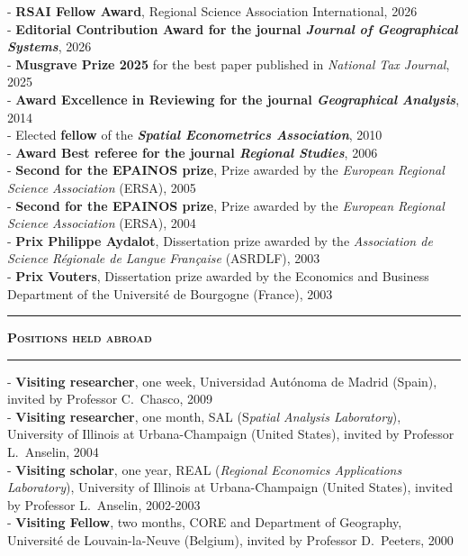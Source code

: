 \documentclass[a4paper,12pt]{article}
\newcommand{\titre}[1]{%
	\bigskip
	\noindent \rule[2mm]{\textwidth}{0.5pt}
	\textbf{\textsc{\large #1}} \\
	\noindent \rule[1mm]{\textwidth}{0.5pt}
	}
\begin{document}
\noindent \noindent - \textbf{RSAI Fellow Award}, Regional Science Association International,  2026 \\
- \textbf{\og{}Editorial Contribution Award\fg{} for the journal \textit{Journal of Geographical Systems}}, 2026 \\
- \textbf{Musgrave Prize 2025} for the best paper published in \textit{National Tax Journal},  2025 \\
- \textbf{Award \og{}Excellence in Reviewing\fg{} for the journal \textit{Geographical Analysis}}, 2014 \\
- Elected \textbf{fellow} of the \textit{\textbf{Spatial Econometrics Association}}, 2010 \\
- \textbf{Award \og{}Best referee\fg{} for the journal \textit{Regional Studies}}, 2006 \\
- \textbf{Second for the EPAINOS prize}, Prize awarded by the \textit{European Regional Science Association} (ERSA), 2005  \\ %
- \textbf{Second for the EPAINOS prize}, Prize awarded by the \textit{European Regional Science Association} (ERSA), 2004 \\ %
- \textbf{Prix Philippe Aydalot}, Dissertation prize awarded by the \textit{Association de Science Régionale de Langue Française} (ASRDLF), 2003 \\
- \textbf{Prix Vouters}, Dissertation prize awarded by the Economics and Business Department of the Université de Bourgogne (France), 2003


\titre{Positions held abroad}

\noindent - \textbf{Visiting researcher}, one week, Universidad Autónoma de Madrid (Spain), invited by Professor C.~Chasco, 2009 \\
- \textbf{Visiting researcher}, one month, SAL (S\textit{patial Analysis Laboratory}), University of Illinois at Urbana-Champaign (United States), invited by Professor L.~Anselin, 2004 \\
- \textbf{Visiting scholar}, one year, REAL (\textit{Regional Economics Applications Laboratory}), University of Illinois at Urbana-Champaign (United States), invited by Professor L.~Anselin, 2002-2003 \\
- \textbf{Visiting Fellow}, two months, CORE and Department of Geography, Université de Louvain-la-Neuve (Belgium), invited by Professor D.~Peeters, 2000 \\
\end{document}
